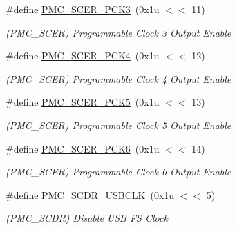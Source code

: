\begin{DoxyCompactItemize}
\#define \mbox{\hyperlink{group__SAMV71__PMC_gad4a2c7840a746ac64b9bed22ff683572}{P\+M\+C\+\_\+\+S\+C\+E\+R\+\_\+\+P\+C\+K3}}~(0x1u $<$$<$ 11)
\begin{DoxyCompactList}\small\item\em (P\+M\+C\+\_\+\+S\+C\+ER) Programmable Clock 3 Output Enable \end{DoxyCompactList}\item 
\mbox{\label{group__SAMV71__PMC_ga439a7f068f5851a2545663aafd715301}} 
\#define \mbox{\hyperlink{group__SAMV71__PMC_ga439a7f068f5851a2545663aafd715301}{P\+M\+C\+\_\+\+S\+C\+E\+R\+\_\+\+P\+C\+K4}}~(0x1u $<$$<$ 12)
\begin{DoxyCompactList}\small\item\em (P\+M\+C\+\_\+\+S\+C\+ER) Programmable Clock 4 Output Enable \end{DoxyCompactList}\item 
\mbox{\label{group__SAMV71__PMC_ga9c510d90dec2ff15e317fa10d74d8957}} 
\#define \mbox{\hyperlink{group__SAMV71__PMC_ga9c510d90dec2ff15e317fa10d74d8957}{P\+M\+C\+\_\+\+S\+C\+E\+R\+\_\+\+P\+C\+K5}}~(0x1u $<$$<$ 13)
\begin{DoxyCompactList}\small\item\em (P\+M\+C\+\_\+\+S\+C\+ER) Programmable Clock 5 Output Enable \end{DoxyCompactList}\item 
\mbox{\label{group__SAMV71__PMC_ga9a55e8adfd2f36577018f765a62e2885}} 
\#define \mbox{\hyperlink{group__SAMV71__PMC_ga9a55e8adfd2f36577018f765a62e2885}{P\+M\+C\+\_\+\+S\+C\+E\+R\+\_\+\+P\+C\+K6}}~(0x1u $<$$<$ 14)
\begin{DoxyCompactList}\small\item\em (P\+M\+C\+\_\+\+S\+C\+ER) Programmable Clock 6 Output Enable \end{DoxyCompactList}\item 
\mbox{\label{group__SAMV71__PMC_gaf181035ac0c43413fd5a5c42fb3ee734}} 
\#define \mbox{\hyperlink{group__SAMV71__PMC_gaf181035ac0c43413fd5a5c42fb3ee734}{P\+M\+C\+\_\+\+S\+C\+D\+R\+\_\+\+U\+S\+B\+C\+LK}}~(0x1u $<$$<$ 5)
\begin{DoxyCompactList}\small\item\em (P\+M\+C\+\_\+\+S\+C\+DR) Disable U\+SB FS Clock \end{DoxyCompactList}\item 
$$
\end{DoxyCompactItemize}
